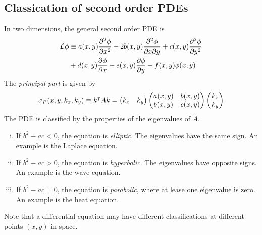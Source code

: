 \subsection{Classication of second order PDEs}
In two dimensions, the general second order PDE is
\begin{align*}
	\mathcal L \phi & \equiv a(x,y) \pdv[2]{\phi}{x} + 2 b(x,y) \pdv{\phi}{x}{y} + c(x,y) \pdv[2]{\phi}{y} \\
	                & + d(x,y) \pdv{\phi}{x} + e(x,y) \pdv{\phi}{y} + f(x,y) \phi(x,y)
\end{align*}
The \textit{principal part} is given by
\[
	\sigma_P (x,y,k_x,k_y) \equiv k^\intercal A k = \begin{pmatrix}
		k_x & k_y
	\end{pmatrix} \begin{pmatrix}
		a(x,y) & b(x,y) \\
		b(x,y) & c(x,y)
	\end{pmatrix} \begin{pmatrix}
		k_x \\ k_y
	\end{pmatrix}
\]
The PDE is classified by the properties of the eigenvalues of \( A \).
\begin{enumerate}[(i)]
	\item If \( b^2 - ac < 0 \), the equation is \textit{elliptic}.
	      The eigenvalues have the same sign.
	      An example is the Laplace equation.
	\item If \( b^2 - ac > 0 \), the equation is \textit{hyperbolic}.
	      The eigenvalues have opposite signs.
	      An example is the wave equation.
	\item If \( b^2 - ac = 0 \), the equation is \textit{parabolic}, where at lease one eigenvalue is zero.
	      An example is the heat equation.
\end{enumerate}
Note that a differential equation may have different classifications at different points \( (x,y) \) in space.

